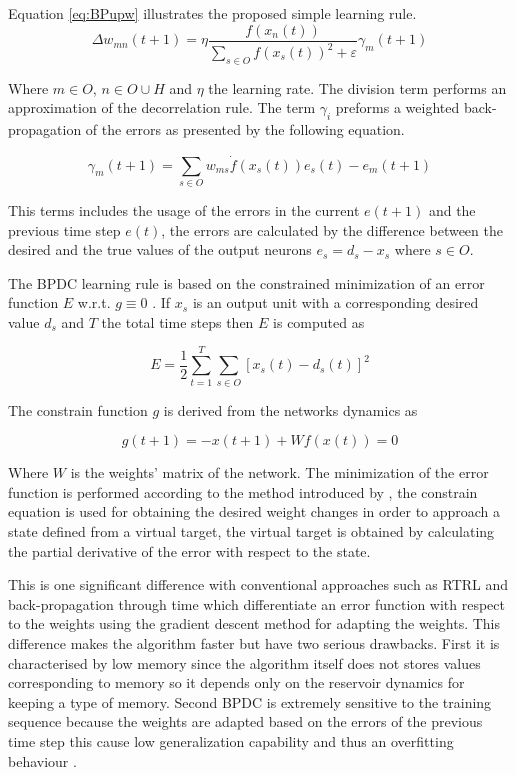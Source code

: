 \documentclass[msc,ai,logo]{infthesis}
\begin{document}
Equation \ref{eq:BPupw} illustrates the proposed simple learning rule. 
\begin{equation}
\label{eq:BPupw}
\Delta {w_{mn}}(t + 1) = \eta \frac{{f({x_n}(t))}}{{\sum\limits_{s \in O} {f{{({x_s}(t))}^2} + \varepsilon } }}{\gamma _m}(t + 1)         
\end{equation}

Where $m \in O $, $n \in O \cup H $ and $ \eta $ the learning rate. The division term performs an approximation of the decorrelation rule. The term $\gamma_i$ preforms a weighted back-propagation of the errors as presented by the following equation.

\begin{equation}
  {\gamma _m}(t + 1) = \sum\limits_{s \in O}^{} {{w_{ms}}\dot f({x_s}(t)){e_s}(t) - {e_m}(t + 1)} 
  \end{equation}  

This terms includes the usage of the errors in the current $e(t+1)$ and the previous time step $e(t)$, the errors are calculated by the difference between the desired and the true values of the output neurons $e_s=d_s-x_s$ where $s \in O$. 

The BPDC learning rule is based on the constrained minimization of an error function $E$ w.r.t. $g \equiv 0$ . If $x_s$ is an output unit with a corresponding desired value $d_s$ and $T$ the total time steps then $E$ is computed as 

\[E = \frac{1}{2}\sum\limits_{t = 1}^T {\sum\limits_{s \in O}^{} {{{[{x_s}(t) - {d_s}(t)]}^2}} } \]    

The constrain function $g$ is derived from the networks dynamics as 

\[g(t + 1) =  - x(t + 1) + Wf(x(t)) = 0\]

Where $W$ is the weights' matrix of the network. The minimization of the error function is performed according to the method introduced by \citep{Atiya}, the constrain equation is used for obtaining the desired weight changes in order to approach a state defined from a virtual target, the virtual target is obtained by calculating the partial derivative of the error with respect to the state. 

This is one significant difference with conventional approaches such as RTRL and back-propagation through time which differentiate an error function with respect to the weights using the gradient descent method for adapting the weights. This difference makes the algorithm faster but have two serious drawbacks. First it is characterised by low memory since the algorithm itself does not stores values corresponding to memory so it depends only on the reservoir dynamics for keeping a type of memory. Second BPDC is extremely sensitive to the training sequence because the weights are adapted based on the errors of the previous time step this cause low generalization capability and thus an overfitting behaviour \citep{Steil2}.   
\end{document}

